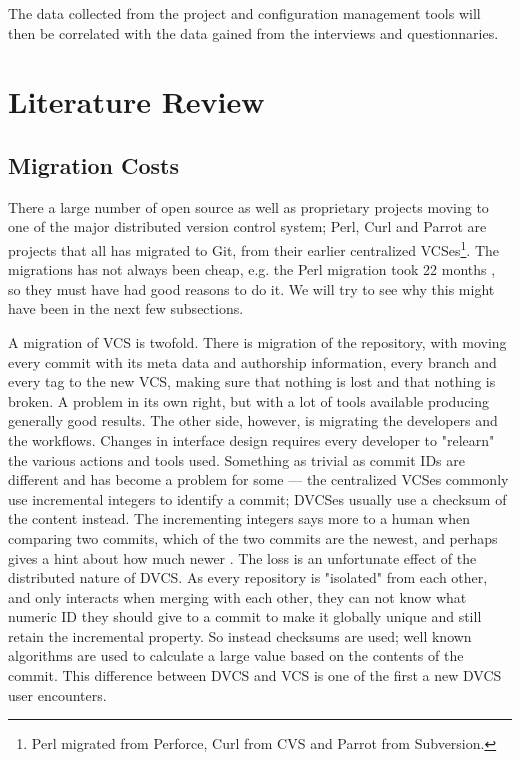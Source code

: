 \documentclass{llncs}
\begin{document}
The data collected from the project and configuration management tools
will then be correlated with the data gained from the interviews and
questionnaries.

\section{Literature Review}


\subsection{Migration Costs}

There a large number of open source as well as proprietary projects
moving to one of the major distributed version control system; Perl,
Curl and Parrot are projects that all has migrated to Git, from their
earlier centralized VCSes\footnote{
 Perl migrated from Perforce, Curl from CVS and Parrot from Subversion.
}. The migrations has not always been cheap, e.g. the Perl migration 
took 22 months \cite{alwis09}, so they must have had good reasons to 
do it. We will try to see why this might have been in the next few
subsections.

A migration of VCS is twofold. There is migration of the repository,
with moving every commit with its meta data and authorship
information, every branch and every tag to the new VCS, making sure
that nothing is lost and that nothing is broken. A problem in its own
right, but with a lot of tools available producing generally good
results. The other side, however, is migrating the developers and the
workflows. Changes in interface design requires every developer to
"relearn" the various actions and tools used. Something as trivial as
commit IDs are different and has become a problem for some
\cite{alwis09} --- the centralized VCSes commonly use incremental
integers to identify a commit; DVCSes usually use a checksum of the
content instead. The incrementing integers says more to a human when
comparing two commits, which of the two commits are the newest, and
perhaps gives a hint about how much newer \cite{bird09}. The loss is
an unfortunate effect of the distributed nature of DVCS. As every
repository is "isolated" from each other, and only interacts when
merging with each other, they can not know what numeric ID they should
give to a commit to make it globally unique and still retain the
incremental property.  So instead checksums are used; well known
algorithms are used to calculate a large value based on the contents
of the commit. This difference between DVCS and VCS is one of the
first a new DVCS user encounters.
\end{document}
